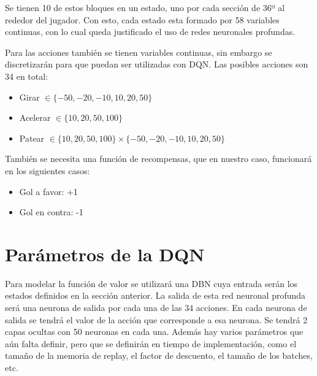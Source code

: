 Se tienen 10 de estos bloques en un estado, uno por cada sección de 36º al rededor del jugador. Con esto, cada estado esta formado por 58 variables continuas, con lo cual queda justificado el uso de redes neuronales profundas.

Para las acciones también se tienen variables continuas, sin embargo se discretizarán para que puedan ser utilizadas con \ac{DQN}. Las posibles acciones son 34 en total:

\begin{itemize}
\item Girar $ \in \{-50, -20, -10, 10, 20, 50\}$
\item Acelerar $ \in \{10, 20, 50, 100\}$
\item Patear $ \in \{10, 20, 50, 100\} \times \{-50, -20, -10, 10, 20, 50\}$
\end{itemize}

También se necesita una función de recompensas, que en nuestro caso, funcionará en los siguientes casos:

\begin{itemize}
\item Gol a favor: +1
\item Gol en contra: -1
\end{itemize}

\section{Parámetros de la \ac{DQN}}

Para modelar la función de valor se utilizará una \ac{DBN} cuya entrada serán los estados definidos en la sección anterior. La salida de esta red neuronal profunda será una neurona de salida por cada una de las 34 acciones. En cada neurona de salida se tendrá el valor de la acción que corresponde a esa neurona. Se tendrá 2 capas ocultas con 50 neuronas en cada una. Además hay varios parámetros que aún falta definir, pero que se definirán en tiempo de implementación, como el tamaño de la memoria de replay, el factor de descuento, el tamaño de los batches, etc.